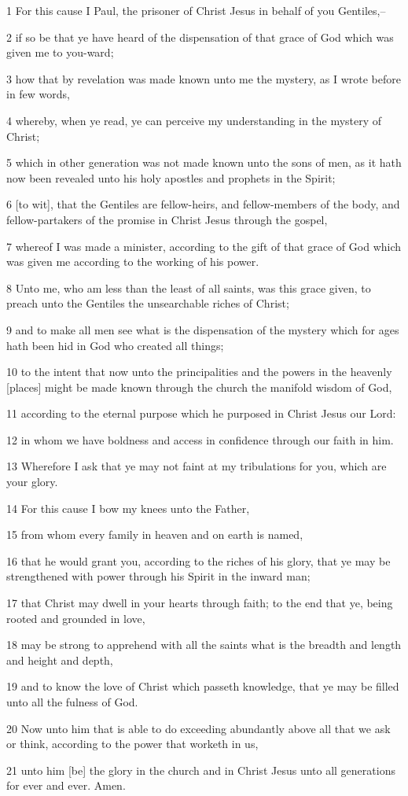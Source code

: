 \par 1 For this cause I Paul, the prisoner of Christ Jesus in behalf of you Gentiles,--
\par 2 if so be that ye have heard of the dispensation of that grace of God which was given me to you-ward;
\par 3 how that by revelation was made known unto me the mystery, as I wrote before in few words,
\par 4 whereby, when ye read, ye can perceive my understanding in the mystery of Christ;
\par 5 which in other generation was not made known unto the sons of men, as it hath now been revealed unto his holy apostles and prophets in the Spirit;
\par 6 [to wit], that the Gentiles are fellow-heirs, and fellow-members of the body, and fellow-partakers of the promise in Christ Jesus through the gospel,
\par 7 whereof I was made a minister, according to the gift of that grace of God which was given me according to the working of his power.
\par 8 Unto me, who am less than the least of all saints, was this grace given, to preach unto the Gentiles the unsearchable riches of Christ;
\par 9 and to make all men see what is the dispensation of the mystery which for ages hath been hid in God who created all things;
\par 10 to the intent that now unto the principalities and the powers in the heavenly [places] might be made known through the church the manifold wisdom of God,
\par 11 according to the eternal purpose which he purposed in Christ Jesus our Lord:
\par 12 in whom we have boldness and access in confidence through our faith in him.
\par 13 Wherefore I ask that ye may not faint at my tribulations for you, which are your glory.
\par 14 For this cause I bow my knees unto the Father,
\par 15 from whom every family in heaven and on earth is named,
\par 16 that he would grant you, according to the riches of his glory, that ye may be strengthened with power through his Spirit in the inward man;
\par 17 that Christ may dwell in your hearts through faith; to the end that ye, being rooted and grounded in love,
\par 18 may be strong to apprehend with all the saints what is the breadth and length and height and depth,
\par 19 and to know the love of Christ which passeth knowledge, that ye may be filled unto all the fulness of God.
\par 20 Now unto him that is able to do exceeding abundantly above all that we ask or think, according to the power that worketh in us,
\par 21 unto him [be] the glory in the church and in Christ Jesus unto all generations for ever and ever. Amen.


